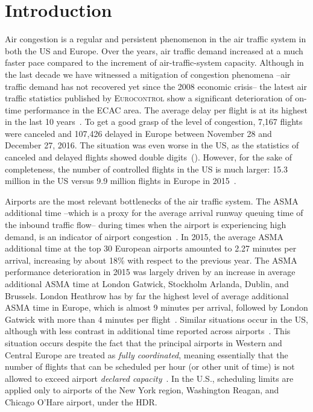 \documentclass[]{elsarticle}
\begin{document}

\section{Introduction}
\label{sec:introduction}

Air congestion is a regular and persistent phenomenon in the air traffic system in both the US and Europe.
Over the years, air traffic demand increased at a much faster pace compared to the increment of air-traffic-system capacity.
Although in the last decade we have witnessed a mitigation of congestion phenomena --air traffic demand has not recovered yet since the 2008 economic crisis-- the latest air traffic statistics published by \textsc{Eurocontrol} show a significant deterioration of on-time performance in the \acl{ECAC} area.
The average delay per flight is at its highest in the last 10 years~\citep{coda2016}.
To get a good grasp of the level of congestion, 7,167 flights were canceled and 107,426  delayed in Europe between November 28 and December 27, 2016.
The situation was even worse in the US, as the statistics of canceled and delayed flights showed double digits~(\citeauthor{flightstats}).
However, for the sake of completeness, the number of controlled flights in the US is much larger: 15.3 million  in the US versus 9.9 million flights in Europe in 2015~\citep{EUCTRL-FAA2015}.

Airports are the most relevant bottlenecks of the air traffic system. The \ac{ASMA} additional time --which is a proxy for the average arrival runway queuing time of the inbound traffic flow-- during times when the airport is experiencing high demand, is an indicator of airport congestion~\citep{ASMA-def}. In 2015, the average \acs{ASMA} additional time at the top 30 European airports amounted to  2.27 minutes per arrival, increasing by about 18\% with respect to the previous year.
The \ac{ASMA} performance deterioration in 2015 was largely driven by an increase in average additional \ac{ASMA} time at London Gatwick, Stockholm Arlanda, Dublin, and Brussels.
London Heathrow has by far the highest level of average additional \ac{ASMA} time in Europe, which is almost 9 minutes per arrival, followed by London Gatwick with more than 4 minutes per flight~\citep{PRR2015}.
Similar situations occur in the US, although with less contrast in additional time reported across airports~\citep{EUCTRL-FAA2015}.
This situation occurs despite the fact that the principal airports in Western and Central Europe are treated as \emph{fully coordinated}, meaning essentially that the number of flights that can be scheduled per hour (or other unit of time) is not allowed to exceed airport \emph{declared capacity}~\citep{deNO2003}.
In the U.S., scheduling limits are applied only to airports of the New York region, Washington Reagan, and Chicago O'Hare airport, under the \acl{HDR}.
\end{document}
